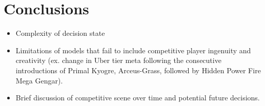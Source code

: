 \documentclass{article}
\begin{document}
\section{Conclusions}

\begin{itemize}
    \item Complexity of decision state
    \item Limitations of models that fail to include competitive player ingenuity and creativity (ex. change in Uber tier meta following the consecutive introductions of Primal Kyogre, Arceus-Grass, followed by Hidden Power Fire Mega Gengar).
    \item Brief discussion of competitive scene over time and potential future decisions.
\end{itemize}

\newpage
\printbibliography
\end{document}
